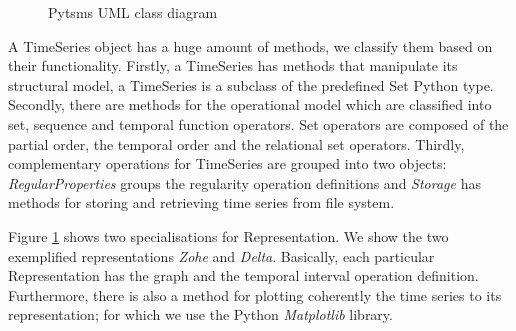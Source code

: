 \begin{figure}[tp]
  \centering



  \caption{Pytsms UML class diagram}
  \label{fig:implementacio:pytsms-uml}
\end{figure}




A TimeSeries object has a huge amount of methods, we classify them
based on their functionality. Firstly, a TimeSeries has methods that
manipulate its structural model, a TimeSeries is a subclass of the
predefined Set Python type. Secondly, there are methods for the
operational model which are classified into set, sequence and temporal
function operators.  Set operators are composed of the partial order,
the temporal order and the relational set operators.  Thirdly,
complementary operations for TimeSeries are grouped into two objects:
\emph{RegularProperties} groups the regularity operation definitions
and \emph{Storage} has methods for storing and retrieving time series
from file system.


Figure \ref{fig:implementacio:pytsms-uml} shows two specialisations
for Representation. We show the two exemplified representations
\emph{Zohe} and \emph{Delta}. Basically, each particular
Representation has the graph and the temporal interval operation
definition. Furthermore, there is also a method for plotting
coherently the time series to its representation; for which we use the
Python \emph{Matplotlib} library.




